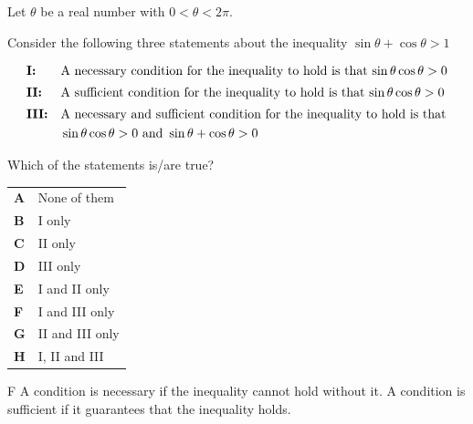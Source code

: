 \documentclass[11pt,a4paper]{article}
\begin{document}
\begin{enumerate}[label=\textbf{\arabic*.},leftmargin=*,itemsep=0pt,start=7]
\questionitem[Logic]
Let $\theta$ be a real number with $0 < \theta < 2\pi$.

Consider the following three statements about the inequality \(\sin\theta + \cos\theta > 1\)

\[
\begin{array}{@{}l l@{}}
\textbf{I:} & \text{A necessary condition for the inequality to hold is that $\sin\theta\cos\theta > 0$} \\[5pt]
\textbf{II:} & \text{A sufficient condition for the inequality to hold is that $\sin\theta\cos\theta > 0$} \\[5pt]
\textbf{III:} &
\begin{aligned}[t]
&\text{A necessary and sufficient condition for the inequality to hold is that} \\
&\sin\theta\cos\theta > 0 \text{ and } \sin\theta + \cos\theta > 0 
\end{aligned}
\end{array}
\]

Which of the statements is/are true?

\par\vspace*{12pt}
\begin{tabularx}{\linewidth}{@{}>{\bfseries}l Y@{}}
A &
None of them
\\[0.8em]
B &
I only
\\[0.8em]
C &
II only
\\[0.8em]
D &
III only
\\[0.8em]
E &
I and II only
\\[0.8em]
F &
I and III only
\\[0.8em]
G &
II and III only
\\[0.8em]
H &
I, II and III
\\
\end{tabularx}

\begin{djsSolution}{F}
A condition is necessary if the inequality cannot hold without it. A condition is sufficient if it guarantees that the inequality holds.


\end{djsSolution}
\end{enumerate}
\end{document}
